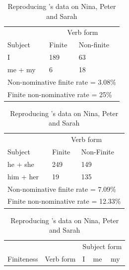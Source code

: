 \FloatBarrier
\begin{table}[!h]
    \caption{Reproducing \cite{schutze1997}'s data on Nina, Peter and Sarah}
    \label{tab:ATOMSchutze}
   \begin{minipage}[t]{0.5\textwidth}
    \centering
    \small
    \begin{tabular}{@{}lll@{}}
        \toprule
         & \multicolumn{2}{c}{Verb form}\\
         \cline{2-3}
        Subject & Finite & Non-finite \\
        \midrule
        I & 189 & 63  \\
        me + my  & 6 & 18 \\
        \hline
         \multicolumn{3}{l}{Non-nominative finite rate = 3.08\%} \\
         \multicolumn{3}{l}{Finite non-nominative rate = 25\%}\\
        \bottomrule
    \end{tabular}
\end{minipage}
\vspace{1ex}
\begin{minipage}[t]{0.5\textwidth}
    \centering
    \small
    \begin{tabular}{@{}lll@{}}
        \toprule
         & \multicolumn{2}{c}{Verb form}\\
         \cline{2-3}
        Subject & Finite & Non-Finite \\
        \midrule
        he + she & 249 & 149 \\
        him + her & 19 & 135 \\
        \hline
         \multicolumn{3}{l}{Non-nominative finite rate = 7.09\%} \\\multicolumn{3}{l}{Finite non-nominative rate = 12.33\%}\\
    \bottomrule
    \end{tabular}
    \end{minipage}
\vspace{1ex}
    \begin{minipage}[t]{0.5\textwidth}
    \centering
    \small
    \begin{tabular}{lllll}
    \toprule
 &  & \multicolumn{3}{l}{Subject form} \\ \cline{3-5} 
Finiteness & Verb form & I & me & my \\ \hline

\end{tabular}
\end{minipage}
\end{table}
